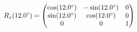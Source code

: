 \documentclass[preview]{standalone}
\begin{document}
\begin{align*}
\special{dvisvgm:raw <g id='unique000'>}R_z(12.0^\circ) = \begin{pmatrix} \cos(12.0^\circ) & -\sin(12.0^\circ) & 0 \\ \sin(12.0^\circ) & \cos(12.0^\circ) & 0 \\ 0 & 0 & 1 \end{pmatrix}\special{dvisvgm:raw </g>}
\end{align*}
\end{document}

